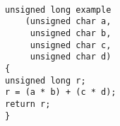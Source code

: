 \footnotesize
\begin{verbatim}

unsigned long example 
	(unsigned char a,
	 unsigned char b,
	 unsigned char c,
	 unsigned char d)
{
unsigned long r;
r = (a * b) + (c * d);
return r;
}
\end{verbatim}
\normalsize
